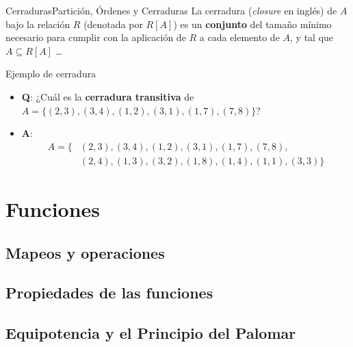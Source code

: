 \documentclass[spanish, c]{beamer}
\begin{document}
\begin{frame}{Cerraduras}{Partición, Órdenes y Cerraduras}
    La \alert{cerradura} (\textit{closure} en inglés) de $A$ bajo la relación $R$ (denotada por $R[A]$) es un \textbf{conjunto} del tamaño mínimo necesario para cumplir con la aplicación de $R$ a cada elemento de $A$, y tal que $A \subseteq R[A]$ \dots

    \pause

    \bigskip

    \begin{exampleblock}{Ejemplo de cerradura}
        \begin{itemize}
            \item \textbf{Q}: ¿Cuál es la \textbf{cerradura transitiva} de $A = \{(2, 3), (3, 4), (1, 2), (3, 1), (1,7),(7,8)\}$?
            \item \textbf{A}: \begin{align*}
                A = \{& (2, 3), (3, 4), (1, 2), (3, 1), (1,7), (7,8), \\
                      & (2, 4), (1, 3), (3, 2), (1, 8), (1, 4), (1, 1), (3, 3)\}
            \end{align*}
        \end{itemize}        
    \end{exampleblock}

    

\end{frame}

\section{Funciones}

\subsection{Mapeos y operaciones}

\subsection{Propiedades de las funciones}

\subsection{Equipotencia y el Principio del Palomar}






\end{document}
